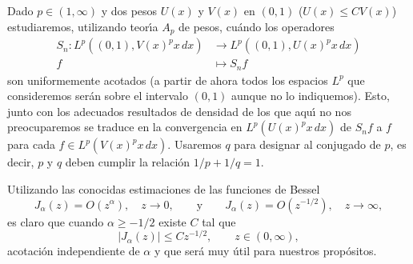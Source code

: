 \documentclass[a4paper]{article}
\newcommand{\longto}{\longrightarrow}
\begin{document}
Dado $p \in (1,\infty)$ y dos pesos $U(x)$ y $V(x)$ en $(0,1)$ 
($U(x) \leq CV(x)$) estudiaremos, utilizando teor\'{\i}a $A_p$ 
de pesos, cu\'ando los operadores
\begin{equation}
\label{eq:1}
\begin{aligned}
  S_{n} : L^p((0,1),V(x)^p x\,dx) &\longto L^p((0,1),U(x)^p x\,dx)\\
  f &\longmapsto S_{n}f
\end{aligned}
\end{equation}
son uniformemente acotados (a partir de ahora todos los espacios 
$L^p$ que consideremos ser\'an sobre el intervalo $(0,1)$ aunque 
no lo indiquemos). Esto, junto con los adecuados resultados de 
densidad de los que aqu\'{\i} no nos preocuparemos se traduce en 
la convergencia en $L^p(U(x)^p x\,dx)$ de $S_{n}f$ a $f$ para cada $f \in 
L^p(V(x)^p x\,dx)$. Usaremos $q$ para designar al conjugado de $p$, 
es decir, $p$ y $q$ deben cumplir la relaci\'on $1/p + 1/q = 1$.

Utilizando las conocidas estimaciones de las funciones de Bessel
\begin{equation*}
  J_{\alpha}(z) = O(z^{\alpha}),
  \quad z \to 0,
  \qquad \text{y} \qquad
  J_{\alpha}(z) = O(z^{-1/2}),
  \quad z \to \infty,
\end{equation*}
es claro que cuando $\alpha \geq -1/2$ existe $C$ tal que
\begin{equation}
\label{eq:2}
  |J_{\alpha}(z)| \leq C z^{-1/2},
  \qquad z \in (0,\infty),
\end{equation}
acotaci\'on independiente de $\alpha$ y que ser\'a muy \'util 
para nuestros prop\'ositos.
\end{document}
